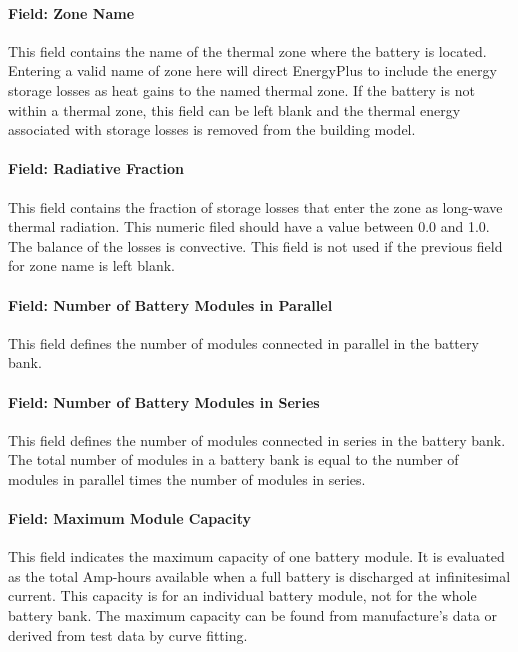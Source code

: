 \paragraph{Field: Zone Name}\label{field-zone-name-6-000}

This field contains the name of the thermal zone where the battery is located. Entering a valid name of zone here will direct EnergyPlus to include the energy storage losses as heat gains to the named thermal zone. If the battery is not within a thermal zone, this field can be left blank and the thermal energy associated with storage losses is removed from the building model.

\paragraph{Field: Radiative Fraction}\label{field-radiative-fraction-4}

This field contains the fraction of storage losses that enter the zone as long-wave thermal radiation. This numeric filed should have a value between 0.0 and 1.0. The balance of the losses is convective. This field is not used if the previous field for zone name is left blank.

\paragraph{Field: Number of Battery Modules in Parallel}\label{field-number-of-battery-modules-in-parallel}

This field defines the number of modules connected in parallel in the battery bank.

\paragraph{Field: Number of Battery Modules in Series}\label{field-number-of-battery-modules-in-series}

This field defines the number of modules connected in series in the battery bank. The total number of modules in a battery bank is equal to the number of modules in parallel times the number of modules in series.

\paragraph{Field: Maximum Module Capacity}\label{field-maximum-module-capacity}

This field indicates the maximum capacity of one battery module. It is evaluated as the total Amp-hours available when a full battery is discharged at infinitesimal current. This capacity is for an individual battery module, not for the whole battery bank. The maximum capacity can be found from manufacture's data or derived from test data by curve fitting.

